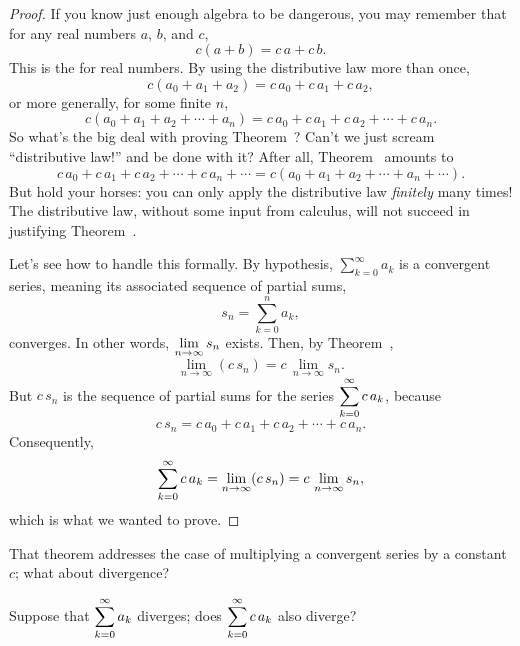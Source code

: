 \begin{proof}
  If you know just enough algebra to be dangerous, you may remember
  that for any real numbers $a$, $b$, and $c$,
  $$
  c(a+b) = c \, a + c \, b.
  $$
  This is the  for
  real numbers.  By using the distributive law more than once, 
  $$
  c(a_0+a_1+a_2) = c \, a_0  + c \, a_1 + c \, a_2,
  $$
  or more generally, for some finite $n$,
  $$
  c(a_0+a_1+a_2 + \cdots + a_n) = c \, a_0  + c \, a_1 + c \, a_2 + \cdots + c \, a_n.
  $$
  So what's the big deal with proving
  Theorem~\label{thm:distributive-over-series}?  Can't we just scream
  ``distributive law!'' and be done with it?  After all,
  Theorem~\label{thm:distributive-over-series} amounts to 
  $$
  c \, a_0  + c \, a_1 + c \, a_2 + \cdots + c \, a_n + \cdots = c(a_0+a_1+a_2 + \cdots + a_n + \cdots ).
  $$
  But hold your horses: you can only apply the distributive law
  \textit{finitely} many times!  The distributive law, without some
  input from calculus, will not succeed in justifying
  Theorem~\label{thm:distributive-over-series}.

  Let's see how to handle this formally.  By hypothesis,
  $\sum_{k=0}^\infty a_k$ is a convergent series, meaning its associated sequence of partial sums,
  $$
  s_n = \sum_{k=0}^n a_k,
  $$
  converges.  In other words, $\displaystyle\lim_{n \to \infty} s_n$ exists.  Then, by Theorem~\label{thm:distributive-over-series},
  $$
  \lim_{n \to \infty} (c\, s_n) = c \, \lim_{n \to \infty} s_n.
  $$
  But $c \, s_n$ is the sequence of partial sums for the series $\displaystyle\sum_{k=0}^\infty c \, a_k$, because
  $$
  c \, s_n = c\, a_0 + c\, a_1 + c \, a_2 + \cdots + c \, a_n.
  $$
  Consequently,
  $$ 
  \displaystyle\sum_{k=0}^\infty c \, a_k = \lim_{n \to \infty} (c \, s_n) = c \, \lim_{n \to \infty} s_n,
  $$
  which is what we wanted to prove.
\end{proof}

That theorem addresses the case of multiplying a convergent series by
a constant $c$; what about divergence?

\begin{example}
Suppose that $\displaystyle\sum_{k=0}^\infty a_k$ diverges; does $\displaystyle\sum_{k=0}^\infty c\,a_k$ also diverge?
\end{example}

